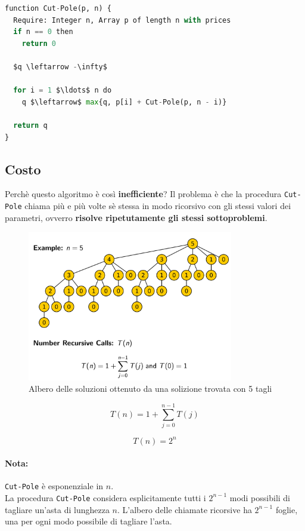 \begin{lstlisting}[language=Python, mathescape=true]
function Cut-Pole(p, n) {
  Require: Integer n, Array p of length n with prices
  if n == 0 then
    return 0

  $q \leftarrow -\infty$

  for i = 1 $\ldots$ n do
    q $\leftarrow$ max{q, p[i] + Cut-Pole(p, n - i)}

  return q
}
\end{lstlisting}

\subsection{Costo}

Perchè questo algoritmo è così \textbf{inefficiente}? Il problema è che
la procedura \texttt{Cut-Pole} chiama più e più volte sè stessa in modo
ricorsivo con gli stessi valori dei parametri, ovverro \textbf{risolve
  ripetutamente gli stessi sottoproblemi}.
\begin{figure}[H]
  \centering
  \includegraphics[width=9cm, keepaspectratio]{capitoli/programmazione_dinamica/imgs/pole4.png}
  \caption{Albero delle soluzioni ottenuto da una solizione trovata con 5 tagli}
\end{figure}

$$
  T(n) = 1 + \sum^{n-1}_{j=0}T(j)
$$

$$
  T(n) = 2^n
$$

\paragraph*{Nota:} \texttt{Cut-Pole} è esponenziale in $n$.\\

La procedura \texttt{Cut-Pole} considera esplicitamente tutti i $2^{n-1}$ modi
possibili di tagliare un'asta di lunghezza $n$. L'albero delle
chiamate ricorsive ha $2^{n-1}$ foglie, una per ogni modo possibile di
tagliare l'asta.

